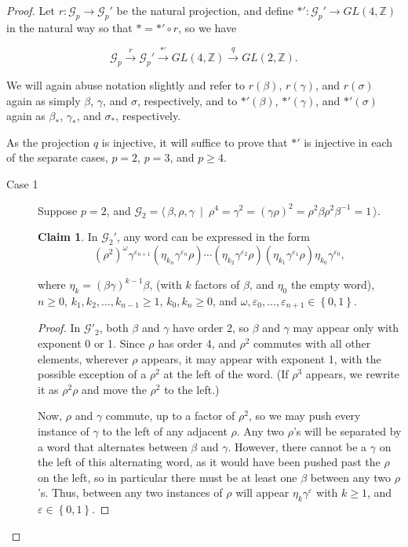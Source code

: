 \documentclass{amsart}     %
\newcommand{\set}[1]{ \left\{ #1 \right\} }
\theoremstyle{definition}
\newtheorem{claim}[thm]{Claim}
\begin{document}
\begin{proof} Let $r : \mathcal{G}_p \to \mathcal{G}_p'$ be the natural projection, and define $*' : \mathcal{G}_p' \to GL(4, \mathbb{Z})$ in the natural way so that $* = *' \circ r$, so we have

\[ \mathcal{G}_p \stackrel{r}{\longrightarrow} \mathcal{G}_p' \stackrel{*'}{\longrightarrow} GL(4, \mathbb{Z}) \stackrel{q}{\longrightarrow} GL(2, \mathbb{Z}).\]

We will again abuse notation slightly and refer to $r(\beta)$, $r(\gamma)$, and $r(\sigma)$ again as simply $\beta$, $\gamma$, and $\sigma$, respectively, and to $*'(\beta)$, $*'(\gamma)$, and $*'(\sigma)$ again as $\beta_*$, $\gamma_*$, and $\sigma_*$, respectively.



As the projection $q$ is injective, it will suffice to prove that $*'$ is injective in each of the separate cases, $p=2$, $p=3$, and $p \geq 4$.

\begin{description}
\item[Case 1] Suppose $p = 2$, and $\mathcal{G}_2 = \langle \, \beta, \rho, \gamma \ \mid \ \rho^4 = \gamma^2 = (\gamma \rho)^2 = \rho^2 \beta \rho^2 \beta^{-1} = 1 \, \rangle$. 
\begin{claim}
\label{claim:G2NormalForm} In $\mathcal{G}_2'$, any word can be expressed in the form 
\[ (\rho^2)^{\omega } \gamma^{\varepsilon_{n+1}} (\eta_{k_n}\gamma^{\varepsilon_n}\rho)\cdots (\eta_{k_2}\gamma^{\varepsilon_2}\rho) (\eta_{k_1}\gamma^{\varepsilon_1}\rho) \eta_{k_0} \gamma^{\varepsilon_{0}}, \]

where $\eta_k = (\beta \gamma)^{k-1} \beta$, (with $k$ factors of $\beta$, and $\eta_0$ the empty word), $n \geq 0$,  $k_1, k_2, \dots, k_{n-1} \geq 1$, $k_0, k_n \geq 0$, and $\omega , \varepsilon_0, \dots, \varepsilon_{n+1} \in \set{0, 1}$.

\end{claim}

\begin{proof}
In $\mathcal{G}'_2$, both $\beta$ and $\gamma$ have order 2, so $\beta$ and $\gamma$ may appear only with exponent 0 or 1. Since $\rho$ has order 4, and $\rho^2$ commutes with all other elements, wherever $\rho$ appears, it may appear with exponent 1, with the possible exception of a $\rho^2$ at the left of the word. (If $\rho^3$ appears, we rewrite it as $\rho^2 \rho$ and move the $\rho^2$ to the left.)

Now, $\rho$ and $\gamma$ commute, up to a factor of $\rho^2$, so we may push every instance of $\gamma$ to the left of any adjacent $\rho$. Any two $\rho$'s will be separated by a word that alternates between $\beta$ and $\gamma$. However, there cannot be a $\gamma$ on the left of this alternating word, as it would have been pushed past the $\rho$ on the left, so in particular there must be at least one $\beta$ between any two $\rho$'s. Thus, between any two instances of $\rho$ will appear $\eta_k \gamma^\varepsilon$ with $k \geq 1$, and $\varepsilon \in \set{0, 1}$.


\end{proof}
\end{description}
\end{proof}
\end{document}
